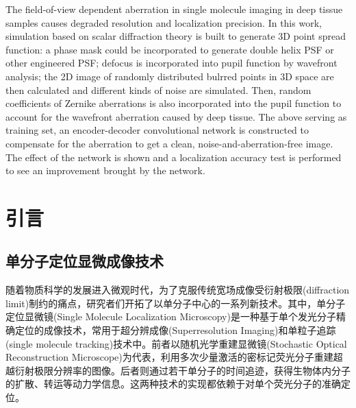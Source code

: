 \documentclass[draft=false,oneside]{fduthesis}
\begin{document}
    \tableofcontents

    \begin{abstract}
        面对较厚生物组织中单分子成像面临的随视野变化的像差问题，本文使用标量衍射理论对三维的点源扩散函数和像差进行了建模，同时可模拟相位掩膜以生成如双螺旋形的三维点源扩散函数。使用波前相位差描述失焦带来的影响，并加入散粒、泊松、读出噪声，由此生成随机点源的单分子模拟图像。为了去除随视野变化而随机扰动的波前像差，使用含有13阶随机Zernike像差(0.65rad rms)的不同密度的随机点源图像作为训练集，不含像差和噪声的理想图像作为标注数据，搭建了基于编码-解码器的有监督卷积神经网络以矫正像差。矫正后的图像表现出更好的质量，并在定位精度测试中优于未矫正图像。
    \end{abstract}

    \begin{abstract*}
        The field-of-view dependent aberration in single molecule imaging in deep tissue samples causes degraded resolution and localization precision. In this work, simulation based on scalar diffraction theory is built to generate 3D point spread function: a phase mask could be incorporated to generate double helix PSF or other engineered PSF; defocus is incorporated into pupil function by wavefront analysis; the 2D image of randomly distributed bulrred points in 3D space are then calculated and different kinds of noise are simulated. Then, random coefficients of Zernike aberrations is also incorporated into the pupil function to account for the wavefront aberration caused by deep tissue. The above serving as training set, an encoder-decoder convolutional network is constructed to compensate for the aberration to get a clean, noise-and-aberration-free image. The effect of the network is shown and a localization accuracy test is performed to see an improvement brought by the network.
    \end{abstract*}

    \chapter{引言}

    \section{单分子定位显微成像技术}
    \par 随着物质科学的发展进入微观时代，为了克服传统宽场成像受衍射极限(diffraction limit)制约的痛点，研究者们开拓了以单分子中心的一系列新技术。其中，单分子定位显微镜(Single Molecule Localization Microscopy)是一种基于单个发光分子精确定位的成像技术，常用于超分辨成像(Superresolution Imaging)和单粒子追踪(single molecule tracking)技术中。前者以随机光学重建显微镜(Stochastic Optical Reconstruction Microscope)\cite{rustSubdiffractionlimitImagingStochastic2006}为代表，利用多次少量激活的密标记荧光分子重建超越衍射极限分辨率的图像。后者则通过若干单分子的时间追迹，获得生物体内分子的扩散、转运等动力学信息。这两种技术的实现都依赖于对单个荧光分子的准确定位。
    
\end{document}
